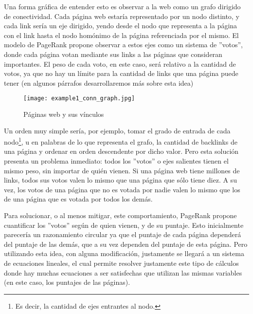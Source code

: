 \par Una forma gr\'afica de entender esto es observar a la web como un grafo
dirigido de conectividad. Cada p\'agina web estar\'ia representado por un nodo
distinto, y cada link ser\'ia un eje dirigido, yendo desde el nodo que
representa a la p\'agina con el link hasta el nodo hom\'onimo de la p\'agina
referenciada por el mismo. El modelo de PageRank propone observar a estos ejes
como un sistema de ''votos'', donde cada p\'agina votan mediante sus links a las
p\'aginas que consideran importantes. El peso de cada voto, en este caso, ser\'a
relativo a la cantidad de votos, ya que no hay un l\'imite para la cantidad de
links que una p\'agina puede tener (en algunos p\'arrafos desarrollaremos m\'as
sobre esta idea)

\begin{wrapfigure}[22]{r}{0.52\textwidth}
    \texttt{[image: example1\_conn\_graph.jpg]}
    \caption{P\'aginas web y sus v\'inculos~\cite{uchicago_research}}
\end{wrapfigure}
\noindent

\par Un orden muy simple ser\'ia, por ejemplo, tomar el grado de entrada de cada
nodo\footnote{Es decir, la cantidad de ejes entrantes al nodo.}, u en palabras
de lo que representa el grafo, la cantidad de backlinks de una p\'agina y
ordenar en orden descendente por dicho valor. Pero esta soluci\'on presenta
un problema inmediato: todos los ''votos'' o ejes salientes tienen el mismo
peso, sin importar de qui\'en vienen. Si una p\'agina web tiene millones de
links, todos sus votos valen lo mismo que una p\'agina que s\'olo tiene diez. A
su vez, los votos de una p\'agina que no es votada por nadie valen lo mismo que
los de una p\'agina que es votada por todos los dem\'as.

\par Para solucionar, o al menos mitigar, este comportamiento, PageRank propone
cuantificar los ''votos'' seg\'un de quien vienen, y de su puntaje. Esto
inicialmente parecer\'ia un razonamiento circular ya que el puntaje de cada
p\'agina depender\'a del puntaje de las dem\'as, que a su vez dependen del
puntaje de esta p\'agina. Pero utilizando esta idea, con alguna modificaci\'on,
justamente se llegar\'a a un sistema de ecuaciones lineales, el cual permite
resolver justamente este tipo de c\'alculos donde hay muchas ecuaciones a ser
satisfechas que utilizan las mismas variables (en este caso, los puntajes de las
p\'aginas).

